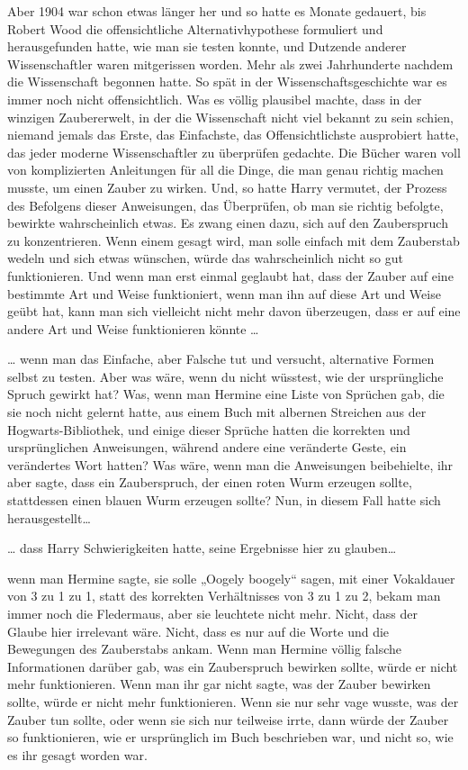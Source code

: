 {Aber 1904 war schon etwas länger her und so hatte es Monate gedauert, bis Robert Wood die offensichtliche Alternativhypothese formuliert und herausgefunden hatte, wie man sie testen konnte, und Dutzende anderer Wissenschaftler waren mitgerissen worden. Mehr als zwei Jahrhunderte nachdem die Wissenschaft begonnen hatte. So spät in der Wissenschaftsgeschichte war es immer noch nicht offensichtlich. Was es völlig plausibel machte, dass in der winzigen Zaubererwelt, in der die Wissenschaft nicht viel bekannt zu sein schien, niemand jemals das Erste, das Einfachste, das Offensichtlichste ausprobiert hatte, das jeder moderne Wissenschaftler zu überprüfen gedachte. Die Bücher waren voll von komplizierten Anleitungen für all die Dinge, die man genau richtig machen musste, um einen Zauber zu wirken. Und, so hatte Harry vermutet, der Prozess des Befolgens dieser Anweisungen, das Überprüfen, ob man sie richtig befolgte, bewirkte wahrscheinlich etwas. Es zwang einen dazu, sich auf den Zauberspruch zu konzentrieren. Wenn einem gesagt wird, man solle einfach mit dem Zauberstab wedeln und sich etwas wünschen, würde das wahrscheinlich nicht so gut funktionieren. Und wenn man erst einmal geglaubt hat, dass der Zauber auf eine bestimmte Art und Weise funktioniert, wenn man ihn auf diese Art und Weise geübt hat, kann man sich vielleicht nicht mehr davon überzeugen, dass er auf eine andere Art und Weise funktionieren könnte …

… wenn man das Einfache, aber Falsche tut und versucht, alternative Formen selbst zu testen. Aber was wäre, wenn du nicht wüsstest, wie der ursprüngliche Spruch gewirkt hat? Was, wenn man Hermine eine Liste von Sprüchen gab, die sie noch nicht gelernt hatte, aus einem Buch mit albernen Streichen aus der Hogwarts-Bibliothek, und einige dieser Sprüche hatten die korrekten und ursprünglichen Anweisungen, während andere eine veränderte Geste, ein verändertes Wort hatten? Was wäre, wenn man die Anweisungen beibehielte, ihr aber sagte, dass ein Zauberspruch, der einen roten Wurm erzeugen sollte, stattdessen einen blauen Wurm erzeugen sollte? Nun, in diesem Fall hatte sich herausgestellt…

… dass Harry Schwierigkeiten hatte, seine Ergebnisse hier zu glauben…

wenn man Hermine sagte, sie solle „Oogely boogely“ sagen, mit einer Vokaldauer von 3 zu 1 zu 1, statt des korrekten Verhältnisses von 3 zu 1 zu 2, bekam man immer noch die Fledermaus, aber sie leuchtete nicht mehr. Nicht, dass der Glaube hier irrelevant wäre. Nicht, dass es nur auf die Worte und die Bewegungen des Zauberstabs ankam. Wenn man Hermine völlig falsche Informationen darüber gab, was ein Zauberspruch bewirken sollte, würde er nicht mehr funktionieren. Wenn man ihr gar nicht sagte, was der Zauber bewirken sollte, würde er nicht mehr funktionieren. Wenn sie nur sehr vage wusste, was der Zauber tun sollte, oder wenn sie sich nur teilweise irrte, dann würde der Zauber so funktionieren, wie er ursprünglich im Buch beschrieben war, und nicht so, wie es ihr gesagt worden war.

}
